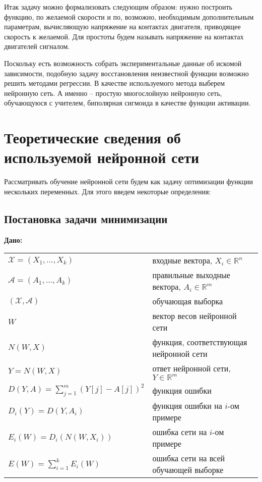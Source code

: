 \documentclass[14pt]{extreport}
\begin{document}
        Итак задачу можно формализовать следующим образом: нужно построить функцию, по желаемой скорости и по, возможно, необходимым дополнительным параметрам, вычисляющую напряжение на контактах двигателя, приводящее скорость к желаемой. Для простоты будем называть напряжение на контактах двигателей сигналом.

        Поскольку есть возможность собрать экспериментальные данные об искомой зависимости, подобную задачу восстановления неизвестной функции возможно решить методами регрессии. В качестве используемого метода выберем нейронную сеть. А именно -- простую многослойную нейронную сеть, обучающуюся с учителем, биполярная сигмоида в качестве функции активации.
\newpage
    \chapter{Теоретические сведения об используемой нейронной сети}

    Рассматривать обучение нейронной сети будем как задачу оптимизации функции нескольких переменных. Для этого введем некоторые определения:

    \section{Постановка задачи минимизации}

        {\bf
            Дано:
        }

        \begin{tabular}{p{6cm} p{7.5cm}}
             $\mathcal{X}=(X_1,\ldots,X_k)$ & входные вектора, $X_i\in\mathbb{R}^n$\\[0.1cm]
             $\mathcal{A}=(A_1,\ldots,A_k)$ & правильные выходные вектора, $A_i\in\mathbb{R}^m$\\[0.1cm]
             $(\mathcal{X},\mathcal{A})$ & обучающая выборка  \\[0.1cm]
             $W$ & вектор весов нейронной сети \\[0.1cm]
             $N(W,X)$ & функция, соответствующая нейронной сети \\[0.1cm]
             $Y=N(W,X)$ & ответ нейронной сети, $Y\in\mathbb{R}^m$ \\[0.1cm]
             $D(Y,A) =\sum_{j=1}^{m} (Y[j]-A[j])^2$ & функция ошибки\\[0.1cm]
             $D_i(Y)=D(Y,A_i) $ & функция ошибки на $i$-ом примере \\[0.1cm]
              $E_i(W)=D_i(N(W,X_i))$ & ошибка сети на $i$-ом примере\\[0.1cm]
              $E(W)=\sum_{i=1}^{k}E_i(W) $ & ошибка сети на всей обучающей выборке \\[0.1cm]
         \end{tabular}
\end{document}
